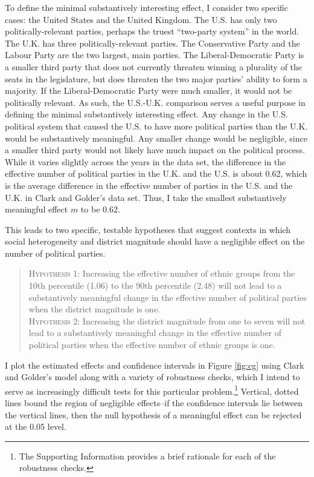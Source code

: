 \documentclass[12pt]{article}
\begin{document}
To define the minimal substantively interesting effect, I consider two specific cases: the United States and the United Kingdom. The U.S. has only two politically-relevant parties, perhaps the truest ``two-party system'' in the world. The U.K. has three politically-relevant parties. The Conservative Party and the Labour Party are the two largest, main parties. The Liberal-Democratic Party is a smaller third party that does not currently threaten winning a plurality of the seats in the legislature, but does threaten the two major parties' ability to form a majority. If the Liberal-Democratic Party were much smaller, it would not be politically relevant. As such, the U.S.-U.K. comparison serves a useful purpose in defining the minimal substantively interesting effect. Any change in the U.S. political system that caused the U.S. to have more political parties than the U.K. would be substantively meaningful. Any smaller change would be negligible, since a smaller third party would not likely have much impact on the political process. While it varies slightly across the years in the data set, the difference in the effective number of political parties in the U.K. and the U.S. is about 0.62, which is the average difference in the effective number of parties in the U.S. and the U.K. in Clark and Golder's data set. Thus, I take the smallest substantively meaningful effect $m$ to be 0.62.

This leads to two specific, testable hypotheses that suggest contexts in which social heterogeneity and district magnitude should have a negligible effect on the number of political parties.
\begin{quote}
\textsc{Hypothesis 1}: Increasing the effective number of ethnic groups from the 10th percentile (1.06) to the 90th percentile (2.48) will not lead to a substantively meaningful change in the effective number of political parties when the district magnitude is one.\vspace{4mm}\\
\textsc{Hypothesis 2}: Increasing the district magnitude from one to seven will not lead to a substantively meaningful change in the effective number of political parties when the effective number of ethnic groups is one.
\end{quote}

I plot the estimated effects and confidence intervals in Figure \ref{fig:cg} using Clark and Golder's model along with a variety of robustness checks, which I intend to serve as increasingly difficult tests for this particular problem.\footnote{The Supporting Information provides a brief rationale for each of the robustness checks.} Vertical, dotted lines bound the region of negligible effects--if the confidence intervals lie between the vertical lines, then the null hypothesis of a meaningful effect can be rejected at the 0.05 level.
\end{document}
